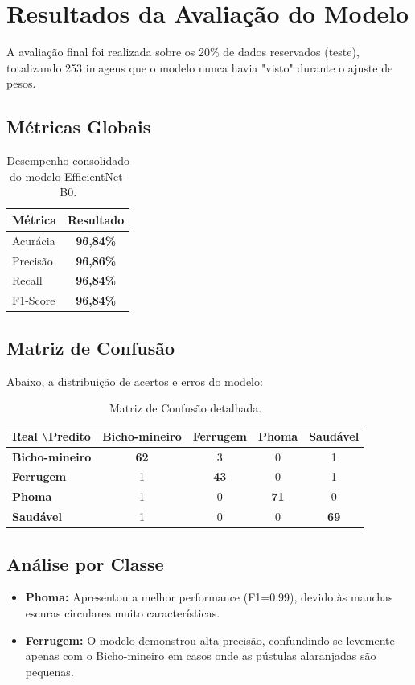 \documentclass[12pt,a4paper]{article}
\begin{document}
\newpage

\section{Resultados da Avaliação do Modelo}

A avaliação final foi realizada sobre os 20\% de dados reservados (teste), totalizando 253 imagens que o modelo nunca havia "visto" durante o ajuste de pesos.

\subsection{Métricas Globais}
\begin{table}[h!]
\centering
\begin{tabular}{@{}lc@{}}
\toprule
\textbf{Métrica} & \textbf{Resultado} \\ \midrule
Acurácia & \textbf{96,84\%} \\
Precisão & \textbf{96,86\%} \\
Recall & \textbf{96,84\%} \\
F1-Score & \textbf{96,84\%} \\ \bottomrule
\end{tabular}
\caption{Desempenho consolidado do modelo EfficientNet-B0.}
\end{table}

\subsection{Matriz de Confusão}
Abaixo, a distribuição de acertos e erros do modelo:

\begin{table}[h!]
\centering
\begin{tabular}{l|cccc}
\toprule
\textbf{Real \textbackslash Predito} & \textbf{Bicho-mineiro} & \textbf{Ferrugem} & \textbf{Phoma} & \textbf{Saudável} \\ \midrule
\textbf{Bicho-mineiro} & \textbf{62} & 3 & 0 & 1 \\
\textbf{Ferrugem} & 1 & \textbf{43} & 0 & 1 \\
\textbf{Phoma} & 1 & 0 & \textbf{71} & 0 \\
\textbf{Saudável} & 1 & 0 & 0 & \textbf{69} \\ \bottomrule
\end{tabular}
\caption{Matriz de Confusão detalhada.}
\end{table}

\subsection{Análise por Classe}
\begin{itemize}
    \item \textbf{Phoma:} Apresentou a melhor performance (F1=0.99), devido às manchas escuras circulares muito características.
    \item \textbf{Ferrugem:} O modelo demonstrou alta precisão, confundindo-se levemente apenas com o Bicho-mineiro em casos onde as pústulas alaranjadas são pequenas.
\end{itemize}
\end{document}
